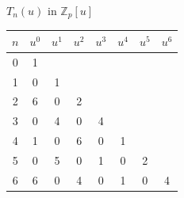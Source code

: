 \documentclass{beamer}
\begin{document}
\begin{frame}{$T_n(u)$ in $\mathbb{Z}_p[u]$}
 \vspace{-6pt}
 \begin{table}[]
  \begin{tabular}{|c|c|c|c|c|c|c|c|}
   \hline
   \multicolumn{1}{|l|}{$n$} & \multicolumn{1}{l|}{$u^0$} & \multicolumn{1}{l|}{$u^1$} & \multicolumn{1}{l|}{$u^2$} & \multicolumn{1}{l|}{$u^3$} & \multicolumn{1}{l|}{$u^4$} & \multicolumn{1}{l|}{$u^5$} & \multicolumn{1}{l|}{$u^6$} \\ \hline
   0                         & 1                          &                            &                            &                            &                            &                            &                            \\ \hline
   1                         & 0                          & 1                          &                            &                            &                            &                            &                            \\ \hline
   2                         & 6                          & 0                          & 2                          &                            &                            &                            &                            \\ \hline
   3                         & 0                          & 4                          & 0                          & 4                          &                            &                            &                            \\ \hline
   4                         & 1                          & 0                          & 6                          & 0                          & 1                          &                            &                            \\ \hline
   5                         & 0                          & 5                          & 0                          & 1                          & 0                          & 2                          &                            \\ \hline
   6                         & 6                          & 0                          & 4                          & 0                          & 1                          & 0                          & 4                          \\ \hline
  \end{tabular}
 \end{table}
\end{frame}
\end{document}
